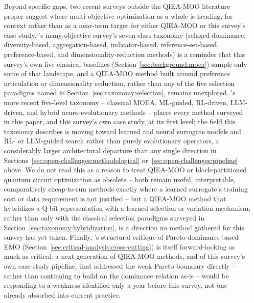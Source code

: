 Beyond specific gaps, two recent surveys outside the QIEA-MOO
literature proper suggest where multi-objective optimization as a
whole is heading, for context rather than as a near-term target for
either QIEA-MOO or this survey's case study.
\citet{li2015manyobjective}'s many-objective survey's seven-class
taxonomy (relaxed-dominance, diversity-based, aggregation-based,
indicator-based, reference-set-based, preference-based, and
dimensionality-reduction methods) is a reminder that this survey's own
five classical baselines (Section~\ref{sec:background:moea}) sample
only some of that landscape, and a QIEA-MOO method built around
preference articulation or dimensionality reduction, rather than any of
the five selection paradigms named in
Section~\ref{sec:taxonomy:selection}, remains unexplored.
\citet{zheng2026paretoneural}'s more recent five-level taxonomy --
classical MOEA, ML-guided, RL-driven, LLM-driven, and hybrid
neuro-evolutionary methods -- places every method surveyed in this
paper, and this survey's own case study, at its first level; the field
this taxonomy describes is moving toward learned and neural surrogate
models and RL- or LLM-guided search rather than purely evolutionary
operators, a considerably larger architectural departure than any
single direction in Sections~\ref{sec:open-challenges:methodological}
or~\ref{sec:open-challenges:pipeline} above. We do not read this as a
reason to treat QIEA-MOO or block-partitioned quantum circuit
optimization as obsolete -- both remain useful, interpretable,
comparatively cheap-to-run methods exactly where a learned surrogate's
training cost or data requirement is not justified -- but a
QIEA-MOO method that hybridizes a Q-bit representation with a learned
selection or variation mechanism, rather than only with the classical
selection paradigms surveyed in
Section~\ref{sec:taxonomy:hybridization}, is a direction no method
gathered for this survey has yet taken. Finally,
\citet{zheng2025weakparetoboundary}'s structural critique of
Pareto-dominance-based EMO (Section~\ref{sec:critical-analysis:cross-cutting})
is itself forward-looking as much as critical: a next generation of
QIEA-MOO methods, and of this survey's own case-study pipeline, that
addressed the weak Pareto boundary directly -- rather than continuing to
build on the dominance relation as-is -- would be responding to a
weakness identified only a year before this survey, not one already
absorbed into current practice.
